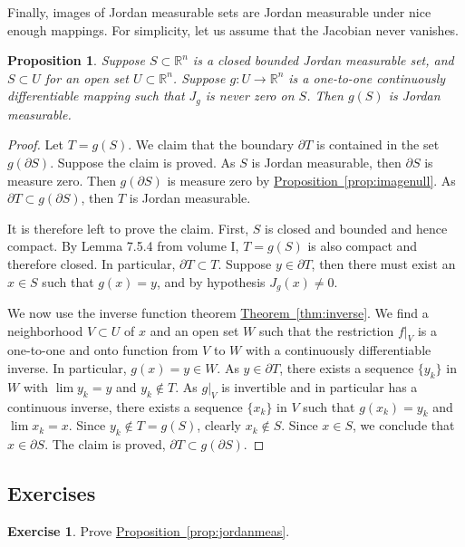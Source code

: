 \documentclass[12pt]{book}
\newcommand{\volIref}[1]{#1}
\newcommand{\R}{{\mathbb{R}}}
\theoremstyle{plain}
\newtheorem{prop}[thm]{Proposition}
\theoremstyle{remark}
\theoremstyle{definition}
\theoremstyle{exercise}
\newtheorem{exercise}{Exercise}[section]
\theoremstyle{example}
\newcommand{\thmref}[1]{\hyperref[#1]{Theorem~\ref*{#1}}}
\newcommand{\propref}[1]{\hyperref[#1]{Proposition~\ref*{#1}}}
\newcommand{\lemmaref}[1]{\hyperref[#1]{Lemma~\ref*{#1}}}
\begin{document}
Finally, images of Jordan measurable sets are Jordan measurable under
nice enough mappings.  For simplicity, let us assume that the Jacobian
never vanishes.

\begin{prop}
Suppose $S \subset \R^n$ is a closed bounded Jordan measurable set,
and $S \subset U$ for an open set $U \subset \R^n$.
Suppose
$g \colon U \to \R^n$ is a one-to-one
continuously differentiable mapping such that
$J_g$ is never zero on $S$.
Then $g(S)$ is Jordan measurable.
\end{prop}

\begin{proof}
Let $T = g(S)$.
We claim that the boundary $\partial T$ is contained in the
set $g(\partial S)$.  Suppose the claim is proved.
As $S$ is Jordan measurable, then
$\partial S$ is measure zero.  Then  $g(\partial S)$ is measure
zero by \propref{prop:imagenull}.  As $\partial T \subset g(\partial
S)$, then $T$ is Jordan measurable.

It is therefore left to prove the claim.  First, $S$ is closed and bounded
and hence compact.  By 
\volIref{Lemma 7.5.4 from volume I},
$T = g(S)$ is
also compact and therefore closed.  In particular, $\partial T \subset T$.
Suppose $y \in \partial T$, then there must exist an
$x \in S$
such that $g(x) = y$, and by hypothesis $J_g(x) \not= 0$.

We now use the inverse function theorem \thmref{thm:inverse}.  We find 
a neighborhood $V \subset U$ of $x$ and an open set $W$ such that
the restriction $f|_V$ is a one-to-one and onto function from $V$ to $W$
with a continuously differentiable inverse.  In particular, $g(x) = y \in W$.
As $y \in \partial T$, there exists a sequence $\{ y_k \}$ in $W$ with
$\lim y_k = y$ and $y_k \notin T$.  As $g|_V$ is invertible and in
particular has a continuous inverse, there exists
a sequence $\{ x_k \}$ in $V$ such that $g(x_k) = y_k$ and $\lim x_k = x$.
Since $y_k \notin T = g(S)$, clearly $x_k \notin S$.  Since $x \in S$, we
conclude that $x \in \partial S$.  The claim is proved, $\partial T \subset
g(\partial S)$.
\end{proof}

\subsection{Exercises}

\begin{exercise}
Prove \propref{prop:jordanmeas}.
\end{exercise}
\end{document}

